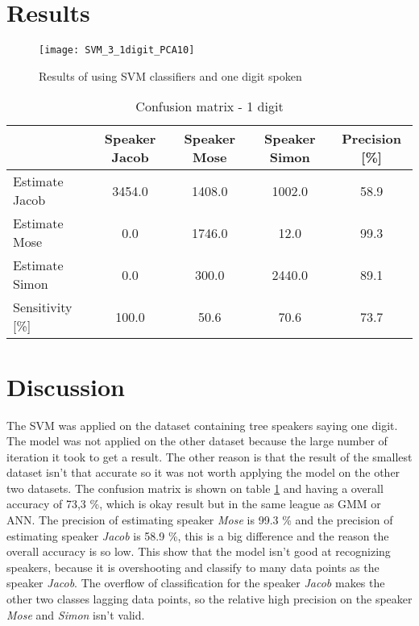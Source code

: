 \section{Results}

\begin{figure}[H]
\centering
\texttt{[image: SVM\_3\_1digit\_PCA10]}
\caption{Results of using SVM classifiers and one digit spoken}
\label{fig:SVM3_1dig_PCA}
\end{figure}

\begin{table}[H]                                                    
\centering                                                          
\begin{tabular}{|l|c|c|c|c|}                                        
\hline                                                              
  & Speaker Jacob & Speaker Mose & Speaker Simon & Precision [\%] \\
\hline                                                              
Estimate Jacob & 3454.0 & 1408.0 & 1002.0 & 58.9 \\                 
\hline                                                              
Estimate Mose & 0.0 & 1746.0 & 12.0 & 99.3 \\                       
\hline                                                              
Estimate Simon & 0.0 & 300.0 & 2440.0 & 89.1 \\                     
\hline                                                              
Sensitivity [\%] & 100.0 & 50.6 & 70.6 & 73.7 \\                    
\hline                                                              
\end{tabular}                                                       
\caption{Confusion matrix - 1 digit}                                
\label{table:SVM_3_conf_1}                                          
\end{table} 


\section{Discussion}
The SVM was applied on the dataset containing tree speakers saying one digit.
The model was not applied on the other dataset because the large number of iteration it took to get a result.
The other reason is that the result of the smallest dataset isn't that accurate so it was not worth applying the model on the other two datasets.   
The confusion matrix is shown on table \ref{table:SVM_3_conf_1} and having a overall accuracy of 73,3 \%, which is okay result but in the same league as GMM or ANN. 
The precision of estimating speaker \textit{Mose} is 99.3 \% and the precision of estimating speaker \textit{Jacob} is 58.9 \%, this is a big difference and the reason the overall accuracy is so low.
This show that the model isn't good at recognizing speakers, because it is overshooting and classify to many data points as the speaker \textit{Jacob}.
The overflow of classification for the speaker \textit{Jacob} makes the other two classes lagging data points, so the relative high precision on the speaker \textit{Mose} and \textit{Simon} isn't valid.  


